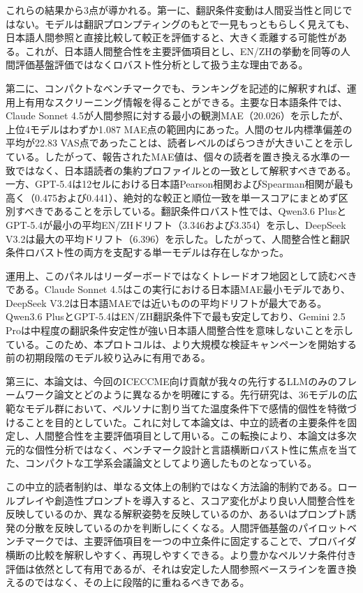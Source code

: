 \documentclass[lualatex,ja=standard,a4paper,11pt]{bxjsarticle}
\begin{document}
これらの結果から3点が導かれる。第一に、翻訳条件変動は人間妥当性と同じではない。モデルは翻訳プロンプティングのもとで一見もっともらしく見えても、日本語人間参照と直接比較して較正を評価すると、大きく乖離する可能性がある。これが、日本語人間整合性を主要評価項目とし、EN/ZHの挙動を同等の人間評価基盤評価ではなくロバスト性分析として扱う主な理由である。

第二に、コンパクトなベンチマークでも、ランキングを記述的に解釈すれば、運用上有用なスクリーニング情報を得ることができる。主要な日本語条件では、Claude Sonnet 4.5が人間参照に対する最小の観測MAE（20.026）を示したが、上位4モデルはわずか1.087 MAE点の範囲内にあった。人間のセル内標準偏差の平均が22.83 VAS点であったことは、読者レベルのばらつきが大きいことを示している。したがって、報告されたMAE値は、個々の読者を置き換える水準の一致ではなく、日本語読者の集約プロファイルとの一致として解釈すべきである。一方、GPT-5.4は12セルにおける日本語Pearson相関およびSpearman相関が最も高く（0.475および0.441）、絶対的な較正と順位一致を単一スコアにまとめず区別すべきであることを示している。翻訳条件ロバスト性では、Qwen3.6 PlusとGPT-5.4が最小の平均EN/ZHドリフト（3.346および3.354）を示し、DeepSeek V3.2は最大の平均ドリフト（6.396）を示した。したがって、人間整合性と翻訳条件ロバスト性の両方を支配する単一モデルは存在しなかった。

運用上、このパネルはリーダーボードではなくトレードオフ地図として読むべきである。Claude Sonnet 4.5はこの実行における日本語MAE最小モデルであり、DeepSeek V3.2は日本語MAEでは近いものの平均ドリフトが最大である。Qwen3.6 PlusとGPT-5.4はEN/ZH翻訳条件下で最も安定しており、Gemini 2.5 Proは中程度の翻訳条件安定性が強い日本語人間整合性を意味しないことを示している。このため、本プロトコルは、より大規模な検証キャンペーンを開始する前の初期段階のモデル絞り込みに有用である。

第三に、本論文は、今回のICECCME向け貢献が我々の先行するLLMのみのフレームワーク論文とどのように異なるかを明確にする。先行研究は、36モデルの広範なモデル群において、ペルソナに割り当てた温度条件下で感情的個性を特徴づけることを目的としていた\cite{shirahama2026mdpi}。これに対して本論文は、中立的読者の主要条件を固定し、人間整合性を主要評価項目として用いる。この転換により、本論文は多次元的な個性分析ではなく、ベンチマーク設計と言語横断ロバスト性に焦点を当てた、コンパクトな工学系会議論文としてより適したものとなっている。

この中立的読者制約は、単なる文体上の制約ではなく方法論的制約である。ロールプレイや創造性プロンプトを導入すると、スコア変化がより良い人間整合性を反映しているのか、異なる解釈姿勢を反映しているのか、あるいはプロンプト誘発の分散を反映しているのかを判断しにくくなる。人間評価基盤のパイロットベンチマークでは、主要評価項目を一つの中立条件に固定することで、プロバイダ横断の比較を解釈しやすく、再現しやすくできる。より豊かなペルソナ条件付き評価は依然として有用であるが、それは安定した人間参照ベースラインを置き換えるのではなく、その上に段階的に重ねるべきである。
\end{document}
